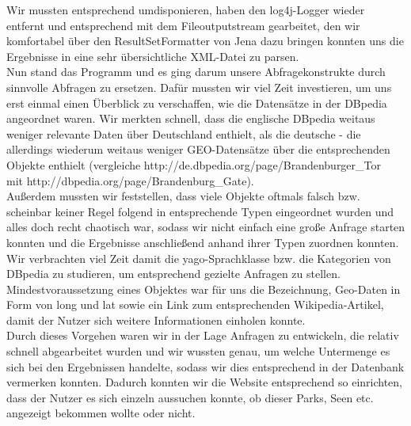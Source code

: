 Wir mussten entsprechend umdisponieren, haben den log4j-Logger wieder
entfernt und entsprechend mit dem Fileoutputstream gearbeitet, den wir
komfortabel über den ResultSetFormatter von Jena dazu bringen konnten uns
die Ergebnisse in eine sehr übersichtliche XML-Datei zu parsen.\\

Nun stand das Programm und es ging darum unsere Abfragekonstrukte durch
sinnvolle Abfragen zu ersetzen. Dafür mussten wir viel Zeit investieren,
um uns erst einmal einen Überblick zu verschaffen, wie die Datensätze in
der DBpedia angeordnet waren. Wir merkten schnell, dass die englische
DBpedia weitaus weniger relevante Daten über Deutschland enthielt, als die
deutsche - die allerdings wiederum weitaus weniger GEO-Datensätze über die
entsprechenden Objekte enthielt (vergleiche http://de.dbpedia.org/page/Brandenburger\_Tor\\
mit http://dbpedia.org/page/Brandenburg\_Gate).\\

Außerdem mussten wir feststellen, dass viele Objekte oftmals falsch bzw.
scheinbar keiner Regel folgend in entsprechende Typen eingeordnet wurden
und alles doch recht chaotisch war, sodass wir nicht einfach eine große
Anfrage starten konnten und die Ergebnisse anschließend anhand ihrer Typen
zuordnen konnten. Wir verbrachten viel Zeit damit die yago-Sprachklasse
bzw. die Kategorien von DBpedia zu studieren, um entsprechend gezielte
Anfragen zu stellen. Mindestvoraussetzung eines Objektes war für uns die
Bezeichnung, Geo-Daten in Form von long und lat sowie ein Link zum
entsprechenden Wikipedia-Artikel, damit der Nutzer sich weitere
Informationen einholen konnte.\\

Durch dieses Vorgehen waren wir in der Lage Anfragen zu entwickeln, die
relativ schnell abgearbeitet wurden und wir wussten genau, um welche
Untermenge es sich bei den Ergebnissen handelte, sodass wir dies
entsprechend in der Datenbank vermerken konnten. Dadurch konnten wir die
Website entsprechend so einrichten, dass der Nutzer es sich einzeln
aussuchen konnte, ob dieser Parks, Seen etc. angezeigt bekommen wollte
oder nicht.
